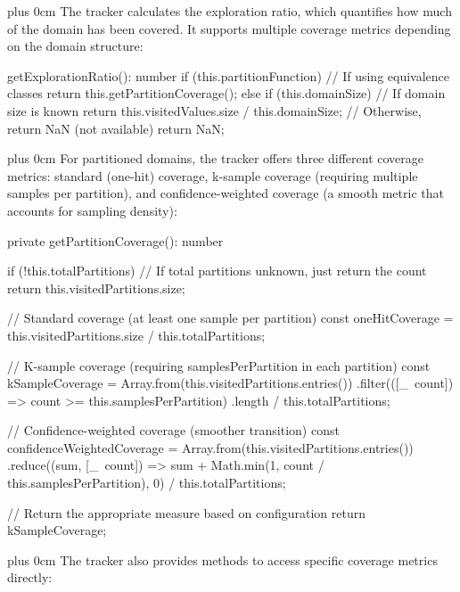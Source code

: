 \documentclass[11pt,a4paper]{article}
\newcommand{\justifytext}{\leftskip=0pt \rightskip=0pt plus 0cm}
\begin{document}
\justifytext
The tracker calculates the exploration ratio, which quantifies how much of the domain has been covered. It supports multiple coverage metrics depending on the domain structure:

\begin{wrappedcode}
  getExplorationRatio(): number {
    if (this.partitionFunction) {
      // If using equivalence classes
      return this.getPartitionCoverage();
    } else if (this.domainSize) {
      // If domain size is known
      return this.visitedValues.size / this.domainSize;
    }
    // Otherwise, return NaN (not available)
    return NaN;
  }
\end{wrappedcode}

\justifytext
For partitioned domains, the tracker offers three different coverage metrics: standard (one-hit) coverage, k-sample coverage (requiring multiple samples per partition), and confidence-weighted coverage (a smooth metric that accounts for sampling density):

\begin{wrappedcode}
  private getPartitionCoverage(): number {
    if (!this.totalPartitions) {
      // If total partitions unknown, just return the count
      return this.visitedPartitions.size;
    }
    
    // Standard coverage (at least one sample per partition)
    const oneHitCoverage = this.visitedPartitions.size / this.totalPartitions;
    
    // K-sample coverage (requiring samplesPerPartition in each partition)
    const kSampleCoverage = Array.from(this.visitedPartitions.entries())
      .filter(([\_\, count]) => count >= this.samplesPerPartition)
      .length / this.totalPartitions;
      
    // Confidence-weighted coverage (smoother transition)
    const confidenceWeightedCoverage = Array.from(this.visitedPartitions.entries())
      .reduce((sum, [\_\, count]) => sum + Math.min(1, count / this.samplesPerPartition), 0) 
      / this.totalPartitions;
    
    // Return the appropriate measure based on configuration
    return kSampleCoverage;
  }
\end{wrappedcode}

\justifytext
The tracker also provides methods to access specific coverage metrics directly:
\end{document}
